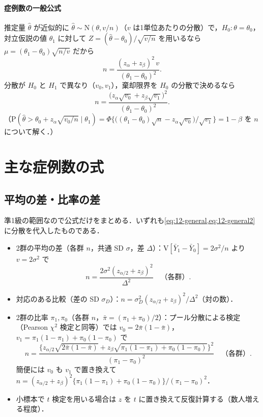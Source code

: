 \documentclass[a4paper,11pt,openany]{ltjsbook}
\newcommand{\V}{\mathrm{V}}
\newcommand{\Prob}{\mathrm{P}}
\newcommand{\Normal}{\mathrm{N}}
\begin{document}
\paragraph{症例数の一般公式}
推定量 $\hat\theta$ が近似的に $\hat\theta\sim\Normal(\theta,v/n)$（$v$ は1単位あたりの分散）で，$H_0:\theta=\theta_0$，対立仮説の値 $\theta_1$ に対して
$Z=(\hat\theta-\theta_0)/\sqrt{v/n}$ を用いるなら $\mu=(\theta_1-\theta_0)\sqrt{n/v}$ だから
\begin{equation}
n=\frac{(z_\alpha+z_\beta)^2\,v}{(\theta_1-\theta_0)^2}.\label{eq:12-general}
\end{equation}
分散が $H_0$ と $H_1$ で異なり（$v_0,v_1$），棄却限界を $H_0$ の分散で決めるなら
\begin{equation}
n=\frac{\bigl(z_\alpha\sqrt{v_0}+z_\beta\sqrt{v_1}\bigr)^2}{(\theta_1-\theta_0)^2}.\label{eq:12-general2}
\end{equation}
（$\Prob(\hat\theta>\theta_0+z_\alpha\sqrt{v_0/n}\mid\theta_1)=\Phi\bigl\{\bigl((\theta_1-\theta_0)\sqrt n-z_\alpha\sqrt{v_0}\bigr)/\sqrt{v_1}\bigr\}=1-\beta$ を $n$ について解く．）

\section{主な症例数の式}\label{sec:12-formulas}
\subsection{平均の差・比率の差}
準1級の範囲なので公式だけをまとめる．いずれも\cref{eq:12-general,eq:12-general2}に分散を代入したものである．
\begin{itemize}
\item 2群の平均の差（各群 $n$，共通 SD $\sigma$，差 $\Delta$）：$\V[\bar Y_1-\bar Y_0]=2\sigma^2/n$ より $v=2\sigma^2$ で
\begin{equation}
n=\frac{2\sigma^2(z_{\alpha/2}+z_\beta)^2}{\Delta^2}\quad\text{（各群）}.\label{eq:12-means}
\end{equation}
\item 対応のある比較（差の SD $\sigma_D$）：$n=\sigma_D^2(z_{\alpha/2}+z_\beta)^2/\Delta^2$（対の数）．
\item 2群の比率 $\pi_1,\pi_0$（各群 $n$，$\bar\pi=(\pi_1+\pi_0)/2$）：プール分散による検定（Pearson $\chi^2$ 検定と同等）では $v_0=2\bar\pi(1-\bar\pi)$，$v_1=\pi_1(1-\pi_1)+\pi_0(1-\pi_0)$ で
\begin{equation}
n=\frac{\bigl\{z_{\alpha/2}\sqrt{2\bar\pi(1-\bar\pi)}+z_\beta\sqrt{\pi_1(1-\pi_1)+\pi_0(1-\pi_0)}\bigr\}^2}{(\pi_1-\pi_0)^2}\quad\text{（各群）}.\label{eq:12-prop}
\end{equation}
簡便には $v_0$ も $v_1$ で置き換えて $n=(z_{\alpha/2}+z_\beta)^2\{\pi_1(1-\pi_1)+\pi_0(1-\pi_0)\}/(\pi_1-\pi_0)^2$．
\item 小標本で $t$ 検定を用いる場合は $z$ を $t$ に置き換えて反復計算する（数人増える程度）．
\end{itemize}
\end{document}

